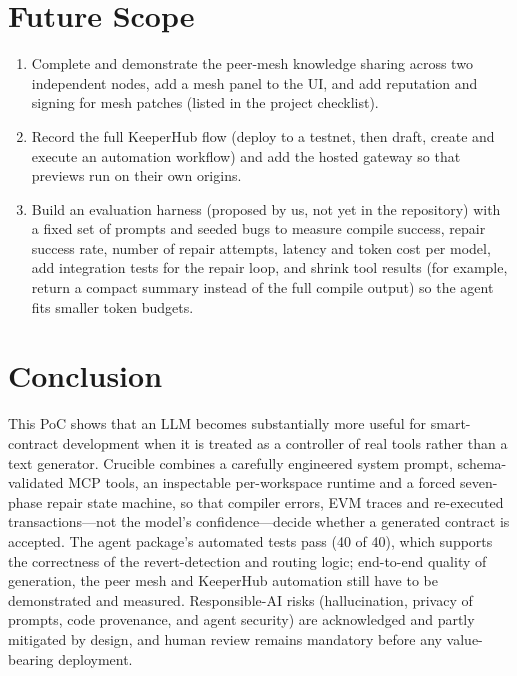 \documentclass[11pt,letterpaper]{article}
\begin{document}
\section{Future Scope}
\begin{enumerate}[leftmargin=1.6em,itemsep=3pt]
  \item Complete and demonstrate the peer-mesh knowledge sharing across two independent nodes, add a mesh panel to the UI, and add reputation and signing for mesh patches (listed in the project checklist).
  \item Record the full KeeperHub flow (deploy to a testnet, then draft, create and execute an automation workflow) and add the hosted gateway so that previews run on their own origins.
  \item Build an evaluation harness (proposed by us, not yet in the repository) with a fixed set of prompts and seeded bugs to measure compile success, repair success rate, number of repair attempts, latency and token cost per model, add integration tests for the repair loop, and shrink tool results (for example, return a compact summary instead of the full compile output) so the agent fits smaller token budgets.
\end{enumerate}

\section{Conclusion}
This PoC shows that an LLM becomes substantially more useful for smart-contract development when it is treated as a controller of real tools rather than a text generator. Crucible combines a carefully engineered system prompt, schema-validated MCP tools, an inspectable per-workspace runtime and a forced seven-phase repair state machine, so that compiler errors, EVM traces and re-executed transactions---not the model's confidence---decide whether a generated contract is accepted. The agent package's automated tests pass (40 of 40), which supports the correctness of the revert-detection and routing logic; end-to-end quality of generation, the peer mesh and KeeperHub automation still have to be demonstrated and measured. Responsible-AI risks (hallucination, privacy of prompts, code provenance, and agent security) are acknowledged and partly mitigated by design, and human review remains mandatory before any value-bearing deployment.
\end{document}
